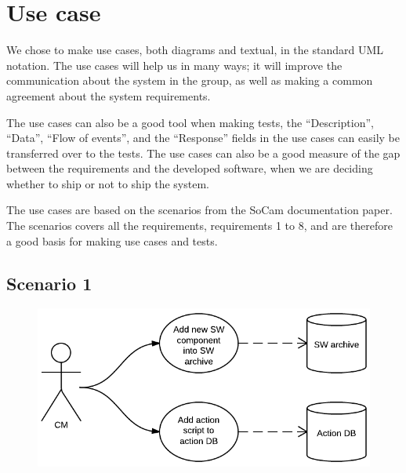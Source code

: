 \chapter{Use case}

We chose to make use cases, both diagrams and textual, in the standard UML notation. 
The use cases will help us in many ways; it will improve the communication about the 
system in the group, as well as making a common agreement about the system requirements.

The use cases can also be a good tool when making tests, the “Description”, “Data”, 
“Flow of events”, and the “Response” fields in the use cases can easily be 
transferred over to the tests. The use cases can also be a good measure of the gap 
between the requirements and the developed software, when we are deciding whether to 
ship or not to ship the system.

The use cases are based on the scenarios from the SoCam documentation paper. The scenarios covers all the requirements, requirements 1 to 8, and are therefore a good basis for making use cases and tests.


\clearpage

\section{Scenario 1}

	\begin{figure}[H]
		\includegraphics[width=\textwidth]{pics/usecase1.png}
	\end{figure}

